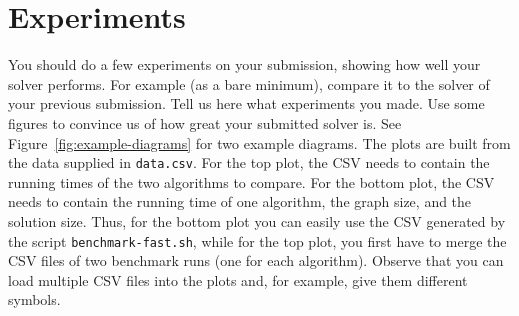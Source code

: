 \documentclass[5p,twocolumn,final]{elsarticle}
\begin{document}
\section{Experiments}
You should do a few experiments on your submission, showing how well your solver performs.
For example (as a bare minimum), compare it to the solver of your previous submission.
Tell us here what experiments you made.
Use some figures to convince us of how great your submitted solver is.
See Figure~\ref{fig:example-diagrams} for two example diagrams.
The plots are built from the data supplied in \texttt{data.csv}.
For the top plot, the CSV needs to contain the running times of the two algorithms to compare.
For the bottom plot, the CSV needs to contain the running time of one algorithm, the graph size, and the solution size.
Thus, for the bottom plot you can easily use the CSV generated by the script \texttt{benchmark-fast.sh}, while for the top plot, you first have to merge the CSV files of two benchmark runs (one for each algorithm).
Observe that you can load multiple CSV files into the plots and, for example, give them different symbols.




\onecolumn
\end{document}
